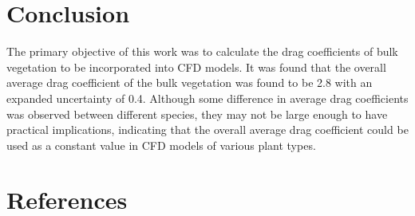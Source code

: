 \documentclass[a4paper,11pt]{article}
\begin{document}
\section{Conclusion}
The primary objective of this work was to calculate the drag coefficients of bulk vegetation to be incorporated into CFD models. It was found that the overall average drag coefficient of the bulk vegetation was found to be 2.8 with an expanded uncertainty of 0.4. Although some difference in average drag coefficients was observed between different species, they may not be large enough to have practical implications, indicating that the overall average drag coefficient could be used as a constant value in CFD models of various plant types.

\section*{References}


\end{document}
